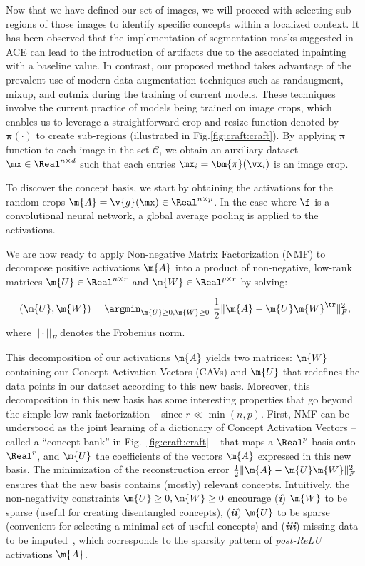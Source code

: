 Now that we have defined our set of images, we will proceed with selecting sub-regions of those images to identify specific concepts within a localized context. It has been observed that the implementation of segmentation masks suggested in ACE can lead to the introduction of artifacts due to the associated inpainting with a baseline value.
In contrast, our proposed method takes advantage of the prevalent use of modern data augmentation techniques such as randaugment, mixup, and cutmix during the training of current models.
These techniques involve the current practice of models being trained on image crops, which enables us to leverage a straightforward crop and resize function denoted by $\bm{\pi}(\cdot)$ to create sub-regions (illustrated in Fig.\ref{fig:craft:craft}). By applying $\bm{\pi}$ function to each image in the set $\mathcal{C}$, we obtain an auxiliary dataset $\mx \in \Real^{n \times d}$ such that each entries $\mx_i = \bm{\pi}(\vx_i)$ is an image crop.

To discover the concept basis, we start by obtaining the activations for the random crops $\m{A} = \v{g}(\mx) \in \Real^{n \times p}$.
In the case where $\f$ is a convolutional neural network, a global average pooling is applied to the activations.


We are now ready to apply Non-negative Matrix Factorization (NMF) to decompose  positive activations $\m{A}$ into a product of non-negative, low-rank matrices $\m{U} \in \Real^{n \times r}$ and $\m{W} \in \Real^{p \times r}$ by solving:

\begin{equation}
\label{eq:craft:nmf}
(\m{U}, \m{W}) = \argmin_{\m{U} \geq 0, \m{W} \geq 0} ~ \frac{1}{2}\|\m{A} - \m{U}\m{W}^\tr \|^2_{F}, %
\end{equation}  
where $||\cdot||_F$ denotes the Frobenius norm.

This decomposition of our activations $\m{A}$ yields two matrices: $\m{W}$ containing our Concept Activation Vectors (CAVs) and $\m{U}$ that redefines the data points in our dataset according to this new basis. Moreover, this decomposition in this new basis has some interesting properties that go beyond the simple low-rank factorization -- since $r \ll \min(n,p)$.
First, NMF can be understood as the joint learning of a dictionary of Concept Activation Vectors -- called a ``concept bank'' in Fig.~\ref{fig:craft:craft} -- that maps a $\Real^p$ basis onto $\Real^r$, and $\m{U}$ the coefficients of the vectors $\m{A}$ expressed in this new basis. 
The minimization of the reconstruction error $\frac{1}{2}\|\m{A} - \m{U}\m{W}\|^2_F$ ensures that the new basis contains (mostly) relevant concepts. Intuitively, the non-negativity constraints $\m{U} \geq 0, \m{W} \geq 0$ encourage (\textbf{\textit{i}}) $\m{W}$ to be sparse (useful for creating disentangled concepts), (\textbf{\textit{ii}})  $\m{U}$ to be sparse (convenient for selecting a minimal set of useful concepts)  and (\textbf{\textit{iii}})  missing data to be imputed~\cite{ren2020using}, which corresponds to the sparsity pattern of \textit{post-ReLU} activations $\m{A}$. 


